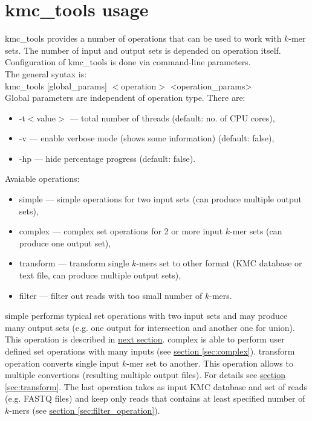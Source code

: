 \clearpage
\section{kmc\_tools usage}
\label{sec:usage}

\textsf{kmc\_tools} provides a number of operations that can be used to work with $k$-mer sets. The number of input and output sets is depended on operation itself. Configuration of \textsf{kmc\_tools} is done via command-line parameters. \\
The general syntax is: \\
kmc\_tools [global\_params] $<$operation$>$ <operation\_params> \\ 

Global parameters are independent of operation type. There are:
\begin{itemize}
	\item \textsf{-t$<$value$>$} --- total number of threads (default: no. of CPU cores),
	\item \textsf{-v} --- enable verbose mode (shows some information) (default: false),
	\item \textsf{-hp} --- hide percentage progress (default: false).
\end{itemize}

Avaiable operations:

\begin{itemize}
	\item \textsf{simple} --- simple operations for two input sets (can produce multiple output sets),
	\item \textsf{complex} --- complex set operations for 2 or more input $k$-mer sets (can produce one output set),
	\item \textsf{transform} --- transform single $k$-mers set to other format (\textsf{KMC} database or text file, can produce multiple output sets),
	\item \textsf{filter} --- filter out reads with too small number of $k$-mers.
\end{itemize}
\textsf{simple} performs typical set operations with two input sets and may produce many output sets (e.g. one output for intersection and another one for union). This operation is described in \hyperref[sec:simple]{next section}. \textsf{complex} is able to perform user defined set operations with many inputs (see \hyperref[sec:complex]{section \ref{sec:complex}}). \textsf{transform} operation converts single input $k$-mer set to another. This operation allows to multiple convertions (resulting multiple output files). For details see \hyperref[sec:transform]{section \ref{sec:transform}}. The last operation takes as input \textsf{KMC} database and set of reads (e.g. FASTQ files) and keep only reads that contains at least specified number of $k$-mers (see \hyperref[sec:filter_operation]{section \ref{sec:filter_operation}}).
